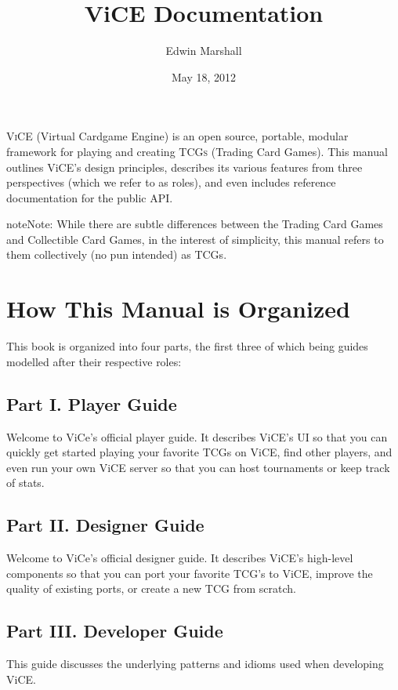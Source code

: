 \documentclass[letterpaper,10pt,english]{sphinxmanual}
\title{ViCE Documentation}
\date{May 18, 2012}
\author{Edwin Marshall}
\begin{document}
\maketitle
\tableofcontents
{}\label{index::doc}


\textsc{ViCE} (Virtual Cardgame Engine) is an open source, portable, modular
framework for playing and creating \textsc{TCGs} (Trading Card Games). This
manual outlines ViCE's design principles, describes its various features from
three perspectives (which we refer to as roles), and even includes reference
documentation for the public API.

\begin{notice}{note}{Note:}
While there are subtle differences between the Trading Card Games and
Collectible Card Games, in the interest of simplicity, this manual refers
to them collectively (no pun intended) as TCGs.
\end{notice}


\chapter{How This Manual is Organized}
\label{index:introduction}\label{index:how-this-manual-is-organized}
This book is organized into four parts, the first three of which being guides
modelled after their respective roles:


\section{Part I. Player Guide}
\label{player_guide/index::doc}\label{player_guide/index:part-i-player-guide}
Welcome to ViCe's official player guide. It describes ViCE's UI so that you
can quickly get started playing your favorite TCGs on ViCE, find other
players, and even run your own ViCE server so that you can host tournaments
or keep track of stats.


\section{Part II. Designer Guide}
\label{designer_guide/index:part-ii-designer-guide}\label{designer_guide/index::doc}
Welcome to ViCe's official designer guide. It describes ViCE's high-level
components so that you can port your favorite TCG's to ViCE, improve
the quality of existing ports, or create a new TCG from scratch.


\section{Part III. Developer Guide}
\label{developer_guide/index:part-iii-developer-guide}\label{developer_guide/index::doc}
This guide discusses the underlying patterns and idioms used when developing
ViCE.
\end{document}
